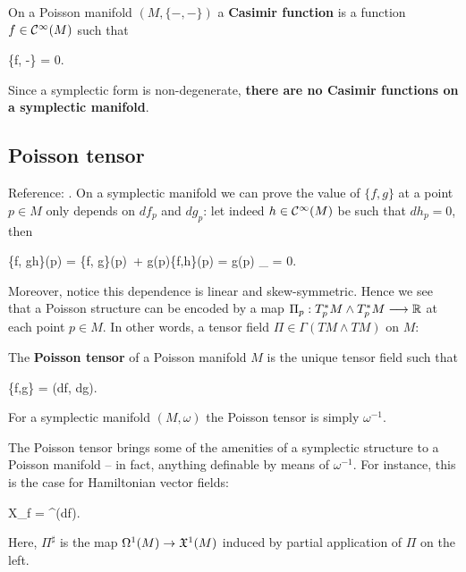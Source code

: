 \begin{definition}
	On a Poisson manifold $(M, \{-,-\})$ a \textbf{Casimir function} is a function $f \in \mathcal{C}^\infty(M)$ such that
	\begin{eqalign}
		\{f, -\} = 0.
	\end{eqalign}
\end{definition}

\begin{remark}
	Since a symplectic form is non-degenerate, \textbf{there are no Casimir functions on a symplectic manifold}.
\end{remark}

\subsection{Poisson tensor}
Reference: \cite{fernandes2014lectures}. On a symplectic manifold we can prove the value of $\{f,g\}$ at a point $p \in M$ only depends on $df_p$ and $dg_p$: let indeed $h \in \mathcal{C}^\infty(M)$ be such that $dh_p = 0$, then
\begin{eqalign}
	\{f, gh\}(p) = \{f, g\}(p)\, + g(p)\{f,h\}(p) = g(p) _{} = 0.
\end{eqalign}
Moreover, notice this dependence is linear and skew-symmetric. Hence we see that a Poisson structure can be encoded by a map $\Pi_p : T^*_pM \wedge T^*_pM \longrightarrow \mathbb{R}$ at each point $p \in M$. In other words, a tensor field $\Pi \in \Gamma(TM \wedge TM)$ on $M$:

\begin{definition}
	The \textbf{Poisson tensor} of a Poisson manifold $M$ is the unique tensor field such that
	\begin{eqalign}
		\{f,g\} = \Pi(df, dg).
	\end{eqalign}
\end{definition}

\begin{example}
	For a symplectic manifold $(M, \omega)$ the Poisson tensor is simply $\omega^{-1}$.
\end{example}

The Poisson tensor brings some of the amenities of a symplectic structure to a Poisson manifold -- in fact, anything definable by means of $\omega^{-1}$. For instance, this is the case for Hamiltonian vector fields:
\begin{eqalign}
\label{eq:ham_vf_from_pi}
	X_f = \Pi^\sharp(df).
\end{eqalign}
Here, $\Pi^\sharp$ is the map $\Omega^1(M) \to \mathfrak{X}^1(M)$ induced by partial application of $\Pi$ on the left.

